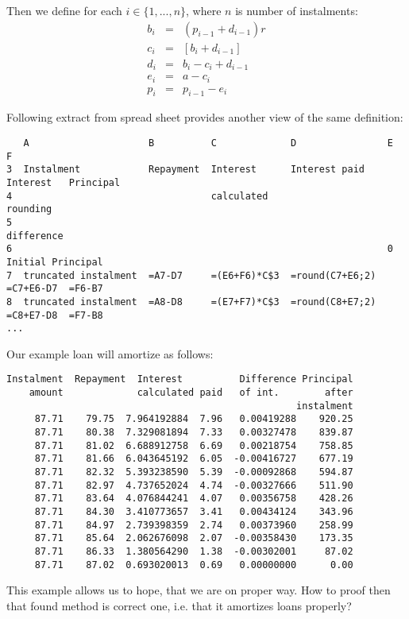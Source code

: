 \documentclass[letterpaper,11pt]{article}
\begin{document}
Then we define for each $i \in \{1,...,n\}$, where $n$ is number of instalments:
$$ \begin{array}{rcl}
b_i & = & (p_{i-1} + d_{i-1})r\\
c_i & = & [b_i + d_{i-1}]\\
d_i & = & b_i - c_i + d_{i-1}\\
e_i & = & a - c_i\\
p_i & = & p_{i-1} - e_i
\end{array}$$

Following extract from spread sheet provides another view of the same definition:

{\small
\begin{verbatim}
   A                     B          C             D                E          F
3  Instalment            Repayment  Interest      Interest paid    Interest   Principal
4                                   calculated                     rounding
5                                                                  difference
6                                                                  0          Initial Principal
7  truncated instalment  =A7-D7     =(E6+F6)*C$3  =round(C7+E6;2)  =C7+E6-D7  =F6-B7
8  truncated instalment  =A8-D8     =(E7+F7)*C$3  =round(C8+E7;2)  =C8+E7-D8  =F7-B8
...
\end{verbatim}
}

Our example loan will amortize as follows:

\begin{verbatim}
Instalment  Repayment  Interest          Difference Principal
    amount             calculated paid   of int.        after
                                                   instalment
     87.71    79.75  7.964192884  7.96   0.00419288    920.25
     87.71    80.38  7.329081894  7.33   0.00327478    839.87
     87.71    81.02  6.688912758  6.69   0.00218754    758.85
     87.71    81.66  6.043645192  6.05  -0.00416727    677.19
     87.71    82.32  5.393238590  5.39  -0.00092868    594.87
     87.71    82.97  4.737652024  4.74  -0.00327666    511.90
     87.71    83.64  4.076844241  4.07   0.00356758    428.26
     87.71    84.30  3.410773657  3.41   0.00434124    343.96
     87.71    84.97  2.739398359  2.74   0.00373960    258.99
     87.71    85.64  2.062676098  2.07  -0.00358430    173.35
     87.71    86.33  1.380564290  1.38  -0.00302001     87.02
     87.71    87.02  0.693020013  0.69   0.00000000      0.00
\end{verbatim}

This example allows us to hope, that we are on proper way. How to proof then that found method is correct one, i.e. that it amortizes loans properly?
\end{document}
